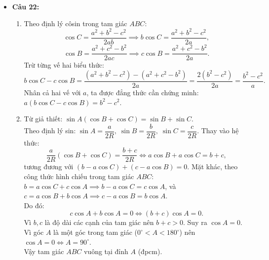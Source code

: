 \documentclass[12pt,a4paper]{article}
\begin{document}
\begin{itemize}[leftmargin=0.6cm, itemsep=2pt, topsep=1pt]
    \item \textbf{Câu 22:}
    \begin{enumerate}[label=\alph*), itemsep=1pt]
        \item Theo định lý côsin trong tam giác $ABC$:
        \[
        \cos C = \dfrac{a^2 + b^2 - c^2}{2ab} \implies b \cos C = \dfrac{a^2 + b^2 - c^2}{2a},
        \]
        \[
        \cos B = \dfrac{a^2 + c^2 - b^2}{2ac} \implies c \cos B = \dfrac{a^2 + c^2 - b^2}{2a}.
        \]
        Trừ từng vế hai biểu thức:
        \[
        b \cos C - c \cos B = \dfrac{(a^2 + b^2 - c^2) - (a^2 + c^2 - b^2)}{2a} = \dfrac{2(b^2 - c^2)}{2a} = \dfrac{b^2 - c^2}{a}.
        \]
        Nhân cả hai vế với $a$, ta được đẳng thức cần chứng minh: $a(b \cos C - c \cos B) = b^2 - c^2$.
        \item Từ giả thiết: $\sin A(\cos B + \cos C) = \sin B + \sin C$.\\
        Theo định lý sin: $\sin A = \dfrac{a}{2R},\; \sin B = \dfrac{b}{2R},\; \sin C = \dfrac{c}{2R}$. Thay vào hệ thức:
        \[
        \dfrac{a}{2R}(\cos B + \cos C) = \dfrac{b + c}{2R} \iff a \cos B + a \cos C = b + c,
        \]
        tương đương với $(b - a \cos C) + (c - a \cos B) = 0$.
        Mặt khác, theo công thức hình chiếu trong tam giác $ABC$: $b = a \cos C + c \cos A \implies b - a \cos C = c \cos A$, và $c = a \cos B + b \cos A \implies c - a \cos B = b \cos A$.\\
        Do đó:
        \[
        c \cos A + b \cos A = 0 \iff (b + c) \cos A = 0.
        \]
        Vì $b, c$ là độ dài các cạnh của tam giác nên $b + c > 0$. Suy ra $\cos A = 0$.\\
        Vì góc $A$ là một góc trong tam giác ($0^\circ < A < 180^\circ$) nên $\cos A = 0 \iff A = 90^\circ$.\\
        Vậy tam giác $ABC$ vuông tại đỉnh $A$ (đpcm).
    \end{enumerate}
\end{itemize}
\end{document}
